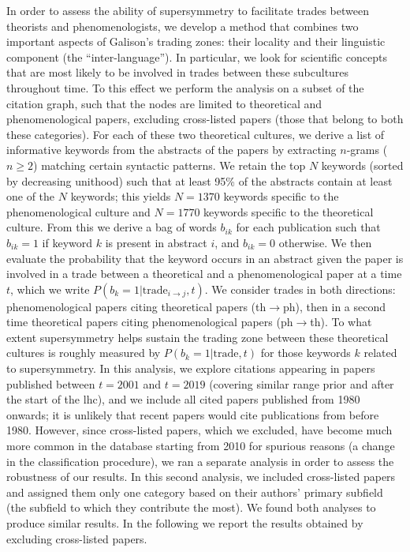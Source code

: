 \documentclass[smallextended]{svjour3}
\begin{document}
In order to assess the ability of supersymmetry to facilitate trades between theorists and phenomenologists, we develop a method that combines two important aspects of Galison's trading zones: their locality and their linguistic component (the ``inter-language''). In particular, we look for scientific concepts that are most likely to be involved in trades between these subcultures throughout time. To this effect we perform the analysis on a subset of the citation graph, such that the nodes are limited to theoretical and phenomenological papers, excluding cross-listed papers (those that belong to both these categories). For each of these two theoretical cultures, we derive a list of informative keywords from the abstracts of the papers by extracting $n$-grams ($n\geq 2$) matching certain syntactic patterns. We retain the top $N$ keywords (sorted by decreasing unithood) such that at least 95\% of the abstracts contain at least one of the $N$ keywords; this yields $N=1370$ keywords specific to the phenomenological culture and $N=1770$ keywords specific to the theoretical culture. From this we derive a bag of words $b_{ik}$ for each publication such that $b_{ik}=1$ if keyword $k$ is present in abstract $i$, and $b_{ik}=0$ otherwise. We then evaluate the probability that the keyword occurs in an abstract given the paper is involved in a trade between a theoretical and a phenomenological paper at a time $t$, which we write $P(b_k=1|\text{trade}_{i\to j},t)$. We consider trades in both directions: phenomenological papers citing theoretical papers (th$\to$ph), then in a second time theoretical papers citing phenomenological papers (ph$\to$th). To what extent supersymmetry helps sustain the trading zone between these theoretical cultures is roughly measured by $P(b_k=1|\text{trade},t)$ for those keywords $k$ related to supersymmetry. In this analysis, we explore citations appearing in papers published between $t=2001$ and $t=2019$ (covering similar range prior and after the start of the \gls{lhc}), and we include all cited papers published from 1980 onwards; it is unlikely that recent papers would cite publications from before 1980. However, since cross-listed papers, which we excluded, have become much more common in the database starting from 2010 for spurious reasons (a change in the classification procedure), we ran a separate analysis in order to assess the robustness of our results. In this second analysis, we included cross-listed papers and assigned them only one category based on their authors' primary subfield (the subfield to which they contribute the most). We found both analyses to produce similar results. In the following we report the results obtained by excluding cross-listed papers.
\end{document}
